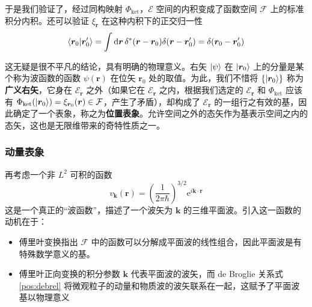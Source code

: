 \documentclass[cn,10pt,math=newtx,citestyle=gb7714-2015,bibstyle=gb7714-2015]{elegantbook}
\def\bm{\boldsymbol}
\def\bf{\textbf}
\def\ms{\mathscr}
\def\mc{\mathcal}
\def\d{\mathrm d}
\def\e{\mathrm e}
\begin{document}
于是我们验证了，经过同构映射 $\Phi_\text{ket}$，$\ms E$ 空间的内积变成了函数空间 $\mc F$ 上的标准积分内积。还可以验证 $\xi_{\bm r}$ 在这种内积下的正交归一性
\begin{equation}
   \braket{\bm r_0|\bm r_0'}=\int\d\bm r\,\delta^*(\bm r-\bm r_0)\delta(\bm r-\bm r_0')=\delta(\bm r_0-\bm r_0')
\end{equation}

这无疑是很不平凡的结论，具有明确的物理意义。右矢 $\ket{\psi}$ 在 $\ket{\bm r_0}$ 上的分量是某个称为波函数的函数 $\psi(\bm r)$ 在位矢 $\bm r_0$ 处的取值。为此，我们不惜将 $\{\ket{\bm r_0}\}$ 称为\bf{广义右矢}，它身在 $\ms E_{\bm r}$ 之外（如果它在 $\ms E_{\bm r}$ 之内，根据我们选定的 $\ms E_{\bm r}$ 和 $\Phi_\text{ket}$ 应该有 $\Phi_\text{ket}(\ket{\bm r_0})=\xi_{\bm r_0}(\bm r)\in \mc F$，产生了矛盾），却构成了 $\ms E_{\bm r}$ 的一组行之有效的基，因此确定了一个表象，称之为\bf{位置表象}。允许空间之外的态矢作为基表示空间之内的态矢，这也是无限维带来的奇特性质之一。

\subsubsection{动量表象}

再考虑一个非 $L^2$ 可积的函数
\begin{equation}
   v_{\bm k}(\bm r)=\left(\frac{1}{2\pi\hbar}\right)^{3/2}\e^{i\bm k\cdot\bm r}
\end{equation}
这是一个真正的“波函数”，描述了一个波矢为 $\bm k$ 的三维平面波。引入这一函数的动机在于：
\begin{itemize}
    \item 傅里叶变换指出 $\mc F$ 中的函数可以分解成平面波的线性组合，因此平面波是有特殊数学意义的基。
    \item 傅里叶正向变换的积分参数 $\bm k$ 代表平面波的波矢，而 de Broglie 关系式 \ref{pos:debrel} 将微观粒子的动量和物质波的波矢联系在一起，这赋予了平面波基以物理意义
\end{itemize}
\end{document}
